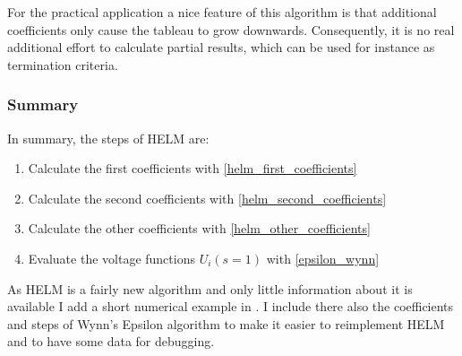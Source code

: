 For the practical application a nice feature of this algorithm is that additional coefficients only cause the tableau to grow downwards. Consequently, it is no real additional effort to calculate partial results, which can be used for instance as termination criteria.

\subsubsection{Summary}
In summary, the steps of HELM are:
\begin{enumerate}
	\item Calculate the first coefficients with \eqref{helm_first_coefficients}
	\item Calculate the second coefficients with \eqref{helm_second_coefficients}
	\item Calculate the other coefficients with \eqref{helm_other_coefficients}
	\item Evaluate the voltage functions $U_i(s = 1)$ with \eqref{epsilon_wynn}
\end{enumerate}

As HELM is a fairly new algorithm and only little information about it is available I add a short numerical example in . I include there also the coefficients and steps of Wynn's Epsilon algorithm to make it easier to reimplement HELM and to have some data for debugging.
